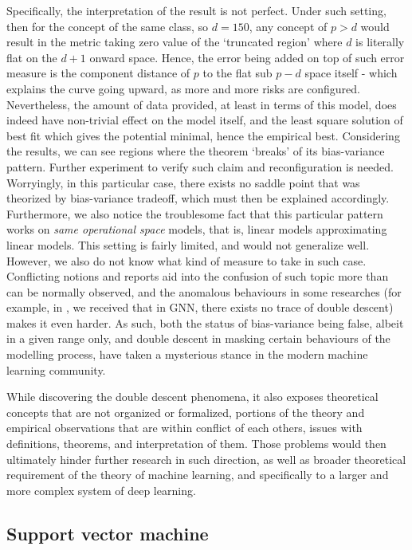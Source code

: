 Specifically, the interpretation of the result is not perfect. Under such setting, then for the concept of the same class, so $d=150$, any concept of $p>d$ would result in the metric taking zero value of the `truncated region' where $d$ is literally flat on the $d+1$ onward space. Hence, the error being added on top of such error measure is the component distance of $p$ to the flat sub $p-d$ space itself - which explains the curve going upward, as more and more risks are configured. Nevertheless, the amount of data provided, at least in terms of this model, does indeed have non-trivial effect on the model itself, and the least square solution of best fit which gives the potential minimal, hence the empirical best. Considering the results, we can see regions where the theorem `breaks' of its bias-variance pattern. Further experiment to verify such claim and reconfiguration is needed. Worryingly, in this particular case, there exists no saddle point that was theorized by bias-variance tradeoff, which must then be explained accordingly. Furthermore, we also notice the troublesome fact that this particular pattern works on \textit{same operational space} models, that is, linear models approximating linear models. This setting is fairly limited, and would not generalize well. However, we also do not know what kind of measure to take in such case. Conflicting notions and reports aid into the confusion of such topic more than can be normally observed, and the anomalous behaviours in some researches (for example, in \cite{shi2024homophilymodulatesdoubledescent}, we received that in GNN, there exists no trace of double descent) makes it even harder. As such, both the status of bias-variance being false, albeit in a given range only, and double descent in masking certain behaviours of the modelling process, have taken a mysterious stance in the modern machine learning community.

While discovering the double descent phenomena, it also exposes theoretical concepts that are not organized or formalized, portions of the theory and empirical observations that are within conflict of each others, issues with definitions, theorems, and interpretation of them. Those problems would then ultimately hinder further research in such direction, as well as broader theoretical requirement of the theory of machine learning, and specifically to a larger and more complex system of deep learning. 

\clearpage

\subsection{Support vector machine}

